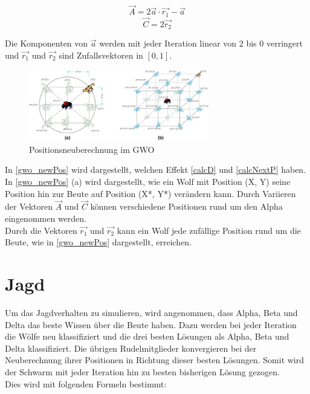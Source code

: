 \begin{equation}
    \vec{A} = 2 \vec{a} \cdot \vec{r_1} - \vec{a}
    \label{calcA}
\end{equation}
\begin{equation}
    \vec{C} = 2 \vec{r_2}
    \label{calcC}
\end{equation}

Die Komponenten von $\vec{a}$ werden mit jeder Iteration linear von $2$ bis $0$ verringert und $\vec{r_1}$ und $\vec{r_2}$ sind Zufallsvektoren in $[0,1]$.\\
\begin{figure}[ht]
    \begin{center}
        \includegraphics[width=0.7\textwidth]{assets/img/Updating_position_of_gray_wolves_in_GWO.jpg}
        \caption[Positionsneuberechnung im GWO]{Positionsneuberechnung im GWO \cite{MIRJALILI201446}}
        \label{gwo_newPos}
    \end{center}
\end{figure}

In \autoref{gwo_newPos} wird dargestellt, welchen Effekt \autoref{calcD} und \autoref{calcNextP} haben. In \autoref{gwo_newPos} (a) wird dargestellt, wie ein Wolf mit Position (X, Y) seine Position hin zur Beute auf Position (X*, Y*) verändern kann. Durch Variieren der Vektoren $\vec{A}$ und $\vec{C}$ können verschiedene Positionen rund um den Alpha eingenommen werden. \\
Durch die Vektoren $\vec{r_1}$ und $\vec{r_2}$ kann ein Wolf jede zufällige Position rund um die Beute, wie in \autoref{gwo_newPos} dargestellt, erreichen.

\section{Jagd}
Um das Jagdverhalten zu simulieren, wird angenommen, dass Alpha, Beta und Delta das beste Wissen über die Beute haben. Dazu werden bei jeder Iteration die Wölfe neu klassifiziert und die drei besten Lösungen als Alpha, Beta und Delta klassifiziert. Die übrigen Rudelmitglieder konvergieren bei der Neuberechnung ihrer Positionen in Richtung dieser besten Lösungen. Somit wird der Schwarm mit jeder Iteration hin zu besten bisherigen Lösung gezogen. \\
Dies wird mit folgenden Formeln bestimmt:

